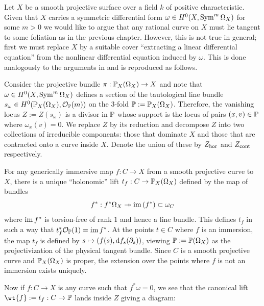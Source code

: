 \documentclass[main.tex]{subfiles}
\begin{document}
Let $X$ be a smooth projective surface over a field $k$ of positive characteristic. Given that $X$ carries a symmetric differential form $\omega \in H^0(X, \Sym^m \Omega_X)$ for some $m > 0$ we would like to argue that any rational curve on $X$ must lie tangent to some foliation as in the previous chapter. However, this is not true in general; first we must replace $X$ by a suitable cover ``extracting a linear differential equation'' from the nonlinear differential equation induced by $\omega$. This is done analogously to the arguments in \cite{bogomolov:families_curves} and is reproduced as follows.

Consider the projective bundle $\pi : \P_X(\Omega_X) \to X$ and note that $\omega \in H^0(X, \Sym^m \Omega_X)$ defines a section of the tautological line bundle $s_{\omega} \in H^0(\P_X(\Omega_X), \cO_{\P}(m))$ on the $3$-fold $\P := \P_X(\Omega_X)$. Therefore, the vanishing locus $Z := Z(s_{\omega})$ is a divisor in $\P$ whose support is the locus of pairs $(x, v) \in \P$ where $\omega_x(v) = 0$. We replace $Z$ by its reduction and decompose $Z$ into two collections of irreducible components: those that dominate $X$ and those that are contracted onto a curve inside $X$. Denote the union of these by $\Zhor$ and $\Zcont$ respectively. 
\par
For any generically immersive map $f : C \to X$ from a smooth projective curve to $X$, there is a unique ``holonomic'' lift $t_f : C \to \P_X(\Omega_X)$ defined by the map of bundles
\[ f^* : f^* \Omega_X \onto \im{(f^*)} \subset \omega_C \]
where $\im{f^*}$ is torsion-free of rank $1$ and hence a line bundle. This defines $t_f$ in such a way that $t_f^* \cO_{\P}(1) = \im{f^*}$. At the points $t \in C$ where $f$ is an immersion, the map $t_f$ is defined by $s \mapsto (f(s), \d{f}_s(\partial_s))$, viewing $\P := \P(\Omega_X)$ as the projectivization of the physical tangent bundle. Since $C$ is a smooth projective curve and $\P_X(\Omega_X)$ is proper, the extension over the points where $f$ is not an immersion exists uniquely.
\par
Now if $f : C \to X$ is any curve such that $f^* \omega = 0$, we see that the canonical lift $\wt{f} := t_f : C \to \P$ lands inside $Z$ giving a diagram:
\begin{center}
\end{center} 
\end{document}
